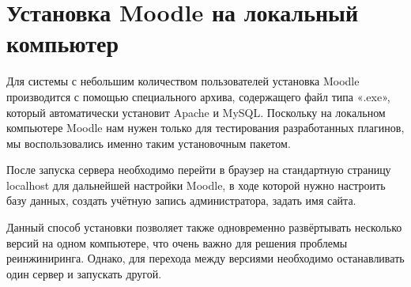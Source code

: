 \section{Установка Moodle на локальный компьютер} \label{ch1:sec2} 

Для системы с небольшим количеством пользователей установка Moodle производится с помощью специального архива, содержащего файл типа «.exe», который автоматически установит Apache и MySQL. Поскольку на локальном компьютере Moodle нам нужен только для тестирования разработанных плагинов, мы воспользовались именно таким установочным пакетом.

После запуска сервера необходимо перейти в браузер на стандартную страницу localhost для дальнейшей настройки Moodle, в ходе которой нужно настроить базу данных, создать учётную запись администратора, задать имя сайта. 

Данный способ установки позволяет также одновременно развёртывать несколько версий на одном компьютере, что очень важно для решения проблемы реинжиниринга. Однако, для перехода между версиями необходимо останавливать один сервер и запускать другой.

